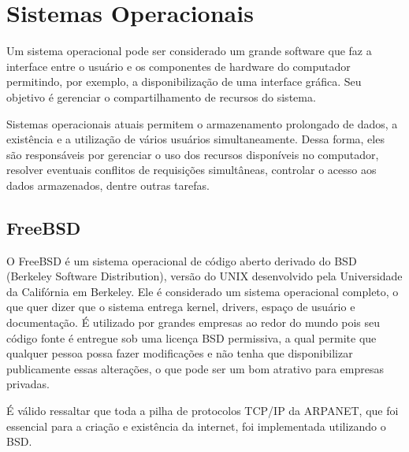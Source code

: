 \section{Sistemas Operacionais}
    
    Um sistema operacional pode ser considerado um grande software que faz a interface entre o usuário e os componentes de hardware do computador permitindo, por exemplo, a disponibilização de uma interface gráfica. Seu objetivo é gerenciar o compartilhamento de recursos do sistema.
      
    Sistemas operacionais atuais permitem o armazenamento prolongado de dados, a existência e a utilização de vários usuários simultaneamente. Dessa forma, eles são responsáveis por gerenciar o uso dos recursos disponíveis no computador, resolver eventuais conflitos de requisições simultâneas, controlar o acesso aos dados armazenados, dentre outras tarefas.

    \subsection{FreeBSD}

        O FreeBSD é um sistema operacional de código aberto derivado do BSD (Berkeley Software Distribution), versão do UNIX desenvolvido pela Universidade da Califórnia em Berkeley. Ele é considerado um sistema operacional completo, o que quer dizer que o sistema entrega kernel, drivers, espaço de usuário e documentação. É utilizado por grandes empresas ao redor do mundo pois seu código fonte é entregue sob uma licença BSD permissiva, a qual permite que qualquer pessoa possa fazer modificações e não tenha que disponibilizar publicamente essas alterações, o que pode ser um bom atrativo para empresas privadas. %

        É válido ressaltar que toda a pilha de protocolos TCP/IP da ARPANET, que foi essencial para a criação e existência da internet, foi implementada utilizando o BSD. %
